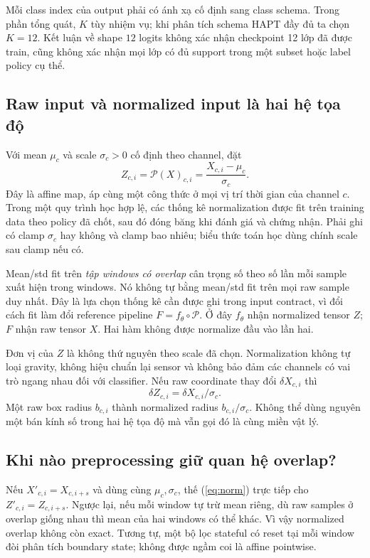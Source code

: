 \documentclass[11pt,a4paper]{article}
\theoremstyle{definition}
\begin{document}
Mỗi class index của output phải có ánh xạ cố định sang class schema.
Trong phần tổng quát, $K$ tùy nhiệm vụ; khi phân tích schema HAPT đầy đủ
ta chọn $K=12$. Kết luận về shape $12$ logits không xác nhận checkpoint
12 lớp đã được train, cũng không xác nhận mọi lớp có đủ support trong
một subset hoặc label policy cụ thể.

\subsection{Raw input và normalized input là hai hệ tọa độ}
Với mean $\mu_c$ và scale $\sigma_c>0$ cố định theo channel, đặt
\begin{equation}
Z_{c,i}=\mathcal P(X)_{c,i}=
\frac{X_{c,i}-\mu_c}{\sigma_c}.
\label{eq:norm}
\end{equation}
Đây là affine map, áp cùng một công thức ở mọi vị trí thời gian của
channel $c$. Trong một quy trình học hợp lệ, các thống kê normalization
được fit trên training data theo policy đã chốt, sau đó đóng băng khi
đánh giá và chứng nhận. Phải ghi có clamp $\sigma_c$ hay không và clamp
bao nhiêu; biểu thức toán học dùng chính scale sau clamp nếu có.

Mean/std fit trên \emph{tập windows có overlap} cân trọng số theo số lần
mỗi sample xuất hiện trong windows. Nó không tự bằng mean/std fit trên
mọi raw sample duy nhất. Đây là lựa chọn thống kê cần được ghi trong
input contract, vì đổi cách fit làm đổi reference pipeline
$F=f_\theta\circ\mathcal P$. Ở đây $f_\theta$ nhận normalized tensor $Z$;
$F$ nhận raw tensor $X$. Hai hàm không được normalize đầu vào lần hai.

Đơn vị của $Z$ là không thứ nguyên theo scale đã chọn. Normalization
không tự loại gravity, không hiệu chuẩn lại sensor và không bảo đảm các
channels có vai trò ngang nhau đối với classifier. Nếu raw coordinate
thay đổi $\delta X_{c,i}$ thì
\begin{equation}
\delta Z_{c,i}=\delta X_{c,i}/\sigma_c.
\end{equation}
Một raw box radius $b_{c,i}$ thành normalized radius
$b_{c,i}/\sigma_c$. Không thể dùng nguyên một bán kính số trong hai hệ
tọa độ mà vẫn gọi đó là cùng miền vật lý.

\subsection{Khi nào preprocessing giữ quan hệ overlap?}
Nếu $X'_{c,i}=X_{c,i+s}$ và dùng cùng $\mu_c,\sigma_c$, thế
(\ref{eq:norm}) trực tiếp cho $Z'_{c,i}=Z_{c,i+s}$. Ngược lại, nếu mỗi
window tự trừ mean riêng, dù raw samples ở overlap giống nhau thì mean
của hai windows có thể khác. Vì vậy normalized overlap không còn exact.
Tương tự, một bộ lọc stateful có reset tại mỗi window đòi phân tích
boundary state; không được ngầm coi là affine pointwise.
\end{document}
